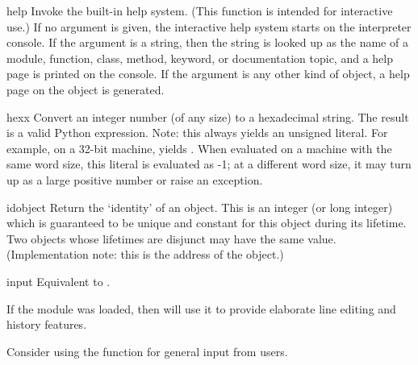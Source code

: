 \begin{funcdesc}{help}{}
  Invoke the built-in help system.  (This function is intended for
  interactive use.)  If no argument is given, the interactive help
  system starts on the interpreter console.  If the argument is a
  string, then the string is looked up as the name of a module,
  function, class, method, keyword, or documentation topic, and a
  help page is printed on the console.  If the argument is any other
  kind of object, a help page on the object is generated.
\end{funcdesc}

\begin{funcdesc}{hex}{x}
  Convert an integer number (of any size) to a hexadecimal string.
  The result is a valid Python expression.  Note: this always yields
  an unsigned literal.  For example, on a 32-bit machine,
   yields .  When evaluated on a
  machine with the same word size, this literal is evaluated as -1; at
  a different word size, it may turn up as a large positive number or
  raise an  exception.
\end{funcdesc}

\begin{funcdesc}{id}{object}
  Return the `identity' of an object.  This is an integer (or long
  integer) which is guaranteed to be unique and constant for this
  object during its lifetime.  Two objects whose lifetimes are
  disjunct may have the same  value.  (Implementation
  note: this is the address of the object.)
\end{funcdesc}

\begin{funcdesc}{input}{}
  Equivalent to .

  If the  module was loaded, then
   will use it to provide elaborate line editing and
  history features.

  Consider using the  function for general input
  from users.
\end{funcdesc}

